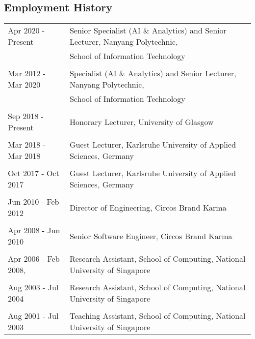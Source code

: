 \documentclass[margin,line]{res}
\begin{document}
\begin{resume}
\section{\sc Employment History}
\begin{tabular}{ll}
 Apr 2020 - Present & Senior Specialist (AI \& Analytics) and Senior
                                        Lecturer, Nanyang Polytechnic,
                                        \\ & School of Information Technology \\ \\
  Mar 2012 - Mar 2020 & Specialist (AI \& Analytics) and Senior
                                        Lecturer, Nanyang Polytechnic,
                                        \\ & School of Information Technology \\ \\
 Sep 2018 - Present & Honorary Lecturer, University of Glasgow
                       \\ \\   
 Mar 2018 - Mar 2018 & Guest Lecturer, Karlsruhe University of Applied Sciences, Germany \\ \\ 
 Oct 2017 - Oct 2017 & Guest Lecturer, Karlsruhe University of Applied Sciences, Germany \\ \\ 
 Jun 2010 - Feb 2012  & Director of Engineering, Circos Brand Karma \\ \\
 Apr 2008 - Jun 2010  & Senior Software Engineer, Circos Brand Karma \\ \\
 Apr 2006 - Feb 2008,  & Research Assistant, School of Computing,
                         National University of Singapore \\  \\
 Aug 2003 - Jul 2004  & Research Assistant, School of Computing, National University of Singapore \\ \\
 Aug 2001 - Jul 2003 & Teaching Assistant,  School of Computing, National University of Singapore 
\end{tabular}


\end{resume}
\end{document}
